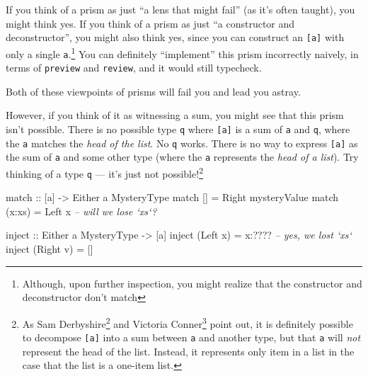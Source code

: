 \documentclass[]{article}
\newenvironment{Shaded}{}{}
\newcommand{\CommentTok}[1]{\textcolor[rgb]{0.38,0.63,0.69}{\textit{#1}}}
\newcommand{\DataTypeTok}[1]{\textcolor[rgb]{0.56,0.13,0.00}{#1}}
\newcommand{\FunctionTok}[1]{\textcolor[rgb]{0.02,0.16,0.49}{#1}}
\newcommand{\NormalTok}[1]{#1}
\newcommand{\OtherTok}[1]{\textcolor[rgb]{0.00,0.44,0.13}{#1}}
\renewcommand{\href}[2]{#2\footnote{\url{#1}}}
\begin{document}
If you think of a prism as just ``a lens that might fail'' (as it's often
taught), you might think yes. If you think of a prism as just ``a constructor
and deconstructor'', you might also think yes, since you can construct an
\texttt{{[}a{]}} with only a single \texttt{a}.\footnote{Although, upon further
  inspection, you might realize that the constructor and deconstructor don't
  match} You can definitely ``implement'' this prism incorrectly naively, in
terms of \texttt{preview} and \texttt{review}, and it would still typecheck.

Both of these viewpoints of prisms will fail you and lead you astray.

However, if you think of it as witnessing a sum, you might see that this prism
isn't possible. There is no possible type \texttt{q} where \texttt{{[}a{]}} is a
sum of \texttt{a} and \texttt{q}, where the \texttt{a} matches the \emph{head of
the list}. No \texttt{q} works. There is no way to express \texttt{{[}a{]}} as
the sum of \texttt{a} and some other type (where the \texttt{a} represents the
\emph{head of a list}). Try thinking of a type \texttt{q} --- it's just not
possible!\footnote{As
  \href{https://twitter.com/samderbyshire/status/1006290478395019265}{Sam
  Derbyshire} and \href{http://disq.us/p/1t5xi3w}{Victoria Conner} point out, it
  is definitely possible to decompose \texttt{{[}a{]}} into a sum between
  \texttt{a} and another type, but that \texttt{a} will \emph{not} represent the
  head of the list. Instead, it represents only item in a list in the case that
  the list is a one-item list.}

\begin{Shaded}
\begin{Highlighting}[]
\OtherTok{match ::}\NormalTok{ [a] }\OtherTok{->} \DataTypeTok{Either}\NormalTok{ a }\DataTypeTok{MysteryType}
\NormalTok{match []     }\FunctionTok{=} \DataTypeTok{Right}\NormalTok{ mysteryValue}
\NormalTok{match (x}\FunctionTok{:}\NormalTok{xs) }\FunctionTok{=} \DataTypeTok{Left}\NormalTok{ x                       }\CommentTok{-- will we lose `xs`?}

\OtherTok{inject ::} \DataTypeTok{Either}\NormalTok{ a }\DataTypeTok{MysteryType} \OtherTok{->}\NormalTok{ [a]}
\NormalTok{inject (}\DataTypeTok{Left}\NormalTok{ x)  }\FunctionTok{=}\NormalTok{ x}\FunctionTok{:????}                   \CommentTok{-- yes, we lost `xs`}
\NormalTok{inject (}\DataTypeTok{Right}\NormalTok{ v) }\FunctionTok{=}\NormalTok{ []}
\end{Highlighting}
\end{Shaded}
\end{document}
